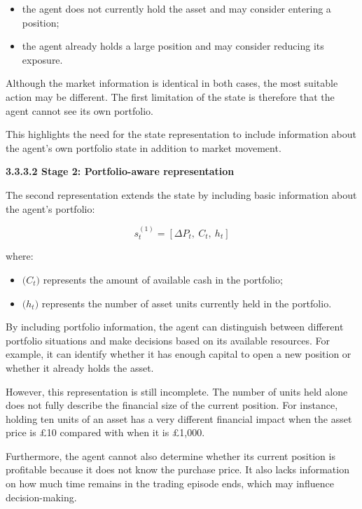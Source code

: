 \begin{itemize}
\item
  the agent does not currently hold the asset and may consider entering
  a position;
\item
  the agent already holds a large position and may consider reducing its
  exposure.
\end{itemize}

Although the market information is identical in both cases, the most
suitable action may be different. The first limitation of the state is
therefore that the agent cannot see its own portfolio.

This highlights the need for the state representation to include
information about the agent's own portfolio state in addition to market
movement.

\textbf{3.3.3.2 Stage 2: Portfolio-aware representation}

The second representation extends the state by including basic
information about the agent's portfolio:

\[s_{t}^{(1)} = \left\lbrack \Delta P_{t},\ C_{t},\ h_{t} \right\rbrack\]

where:

\begin{itemize}
\item
  \(\text{(}C_{t})\) represents the amount of available cash in the
  portfolio;
\item
  \(\text{(}h_{t}\text{)}\) represents the number of asset units
  currently held in the portfolio.
\end{itemize}

By including portfolio information, the agent can distinguish between
different portfolio situations and make decisions based on its available
resources. For example, it can identify whether it has enough capital to
open a new position or whether it already holds the asset.

However, this representation is still incomplete. The number of units
held alone does not fully describe the financial size of the current
position. For instance, holding ten units of an asset has a very
different financial impact when the asset price is £10 compared with
when it is £1,000.

Furthermore, the agent cannot also determine whether its current
position is profitable because it does not know the purchase price. It
also lacks information on how much time remains in the trading episode
ends, which may influence decision-making.

